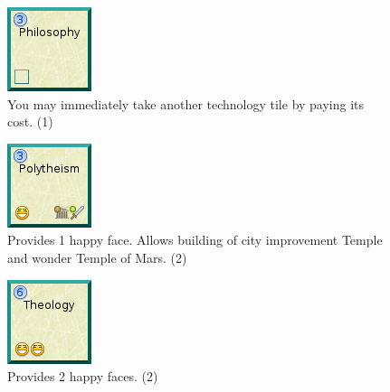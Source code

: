\documentclass[11pt,a4paper,titlepage]{article}
\begin{document}
{{  \begin{figure}[!htb]
    \begin{minipage}[c]{0.1\textwidth}
      \includegraphics[scale=.7]{doe_tech_philosophy.png}
    \end{minipage}\hfill
    \begin{minipage}[c]{0.6\textwidth}
      \captionsetup{labelformat=empty, justification=justified, singlelinecheck=false}
      \caption{You may immediately take another technology tile by paying its cost. (1)}
    \end{minipage}\hfill
    \label{fig:tech_philosophy}
  \end{figure}

  \begin{figure}[!htb]
    \begin{minipage}[c]{0.1\textwidth}
      \includegraphics[scale=.7]{doe_tech_polytheism.png}
    \end{minipage}\hfill
    \begin{minipage}[c]{0.6\textwidth}
      \captionsetup{labelformat=empty, justification=justified, singlelinecheck=false}
      \caption{Provides 1 happy face. Allows building of city improvement Temple and wonder Temple of Mars. (2)}
    \end{minipage}\hfill
    \label{fig:tech_polytheism}
  \end{figure}

  \begin{figure}[!htb]
    \begin{minipage}[c]{0.1\textwidth}
      \includegraphics[scale=.7]{doe_tech_theology.png}
    \end{minipage}\hfill
    \begin{minipage}[c]{0.6\textwidth}
      \captionsetup{labelformat=empty, justification=justified, singlelinecheck=false}
      \caption{Provides 2 happy faces. (2)}
    \end{minipage}\hfill
    \label{fig:tech_theology}
  \end{figure}
  
}}
\end{document}
